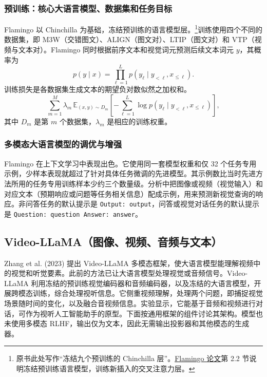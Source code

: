 \subsubsection{预训练：核心大语言模型、数据集和任务目标}
Flamingo 以 Chinchilla 为基础，冻结预训练的语言模型层。\footnote{原书此处写作“冻结九个预训练的 Chinchilla 层”。\href{https://arxiv.org/abs/2204.14198}{Flamingo 论文}第 2.2 节说明冻结预训练语言模型，训练新插入的交叉注意力层。}训练使用四个不同的数据集，即 M3W（交错图文）、ALIGN（图文对）、LTIP（图文对）和 VTP（视频与文本对）。Flamingo 同时根据前序文本和视觉词元预测后续文本词元 $y$，其概率为
\begin{equation}
p(y\mid x)=\prod_{\ell=1}^{L}p(y_\ell\mid y_{<\ell},x_{\leq\ell}).
\label{eq:ch09-flamingo-probability}
\end{equation}
训练损失是各数据集生成文本的期望负对数似然之加权和。
\begin{equation}
\sum_{m=1}^{M}\lambda_m\,
\mathbb{E}_{(x,y)\sim D_m}\left[
-\sum_{\ell=1}^{L}\log p(y_\ell\mid y_{<\ell},x_{\leq\ell})
\right],
\label{eq:ch09-flamingo-loss}
\end{equation}
其中 $D_m$ 是第 $m$ 个数据集，$\lambda_m$ 是相应的训练权重。

\subsubsection{多模态大语言模型的调优与增强}
Flamingo 在上下文学习中表现出色。它使用同一套模型权重和仅 32 个任务专用示例，少样本表现就超过了针对具体任务微调的先进模型。其示例数比当时先进方法所用的任务专用训练样本少约三个数量级。分析中把图像或视频（视觉输入）和对应文本（预期响应或问题等任务相关信息）配成示例，用来预测新视觉查询的响应。非问答任务的默认提示是 \texttt{Output: output}，问答或视觉对话任务的默认提示是 \texttt{Question: question Answer: answer}。

\subsection{Video-LLaMA（图像、视频、音频与文本）}
Zhang et al. (2023) 提出 Video-LLaMA 多模态框架，使大语言模型能理解视频中的视觉和听觉要素。此前的方法已让大语言模型处理视觉或音频信号。Video-LLaMA 利用冻结的预训练视觉编码器和音频编码器，以及冻结的大语言模型，开展跨模态训练，综合处理视听信息。它侧重视频理解，处理两个问题，即捕捉视觉场景随时间的变化，以及融合音视频信息。实验显示，它能基于音频和视频进行对话，可作为视听人工智能助手的原型。下面按通用框架的组件讨论其架构。模型也未使用多模态 RLHF，输出仅为文本，因此无需输出投影器和其他模态的生成器。

